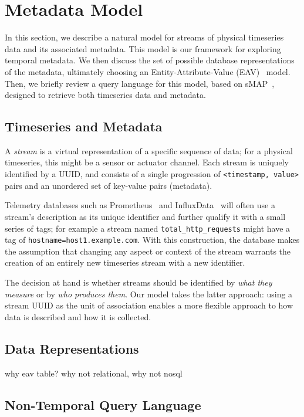 \section{Metadata Model}

In this section, we describe a natural model for streams of physical timeseries
data and its associated metadata. This model is our framework for exploring
temporal metadata. We then discuss the set of possible database representations
of the metadata, ultimately choosing an Entity-Attribute-Value
(EAV)~\cite{chen1976entity} model. Then, we briefly review a query language for
this model, based on sMAP~\cite{dawson2010smap}, designed to retrieve both
timeseries data and metadata.


\subsection{Timeseries and Metadata}

A \emph{stream} is a virtual representation of a specific sequence of data; for
a physical timeseries, this might be a sensor or actuator channel. Each stream
is uniquely identified by a UUID, and consists of a single progression of
\texttt{<timestamp, value>} pairs and an unordered set of key-value pairs
(metadata).

Telemetry databases such as Prometheus~\cite{prometheus} and
InfluxData~\cite{influxdata} will often use a stream's description as its
unique identifier and further qualify it with a small series of tags; for
example a stream named \texttt{total\_http\_requests} might have a tag of
\texttt{hostname=host1.example.com}. With this construction, the database makes
the assumption that changing any aspect or context of the stream warrants the
creation of an entirely new timeseries stream with a new identifier. 

The decision at hand is whether streams should be identified by \emph{what they
measure} or by \emph{who produces them}. Our model takes the latter approach:
using a stream UUID as the unit of association enables a more flexible approach
to how data is described and how it is collected.

\subsection{Data Representations}

why eav table? why not relational, why not nosql

\subsection{Non-Temporal Query Language}

